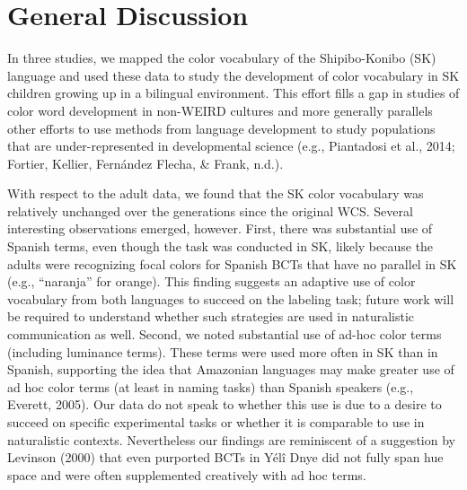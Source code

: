 \documentclass[
  english,
  ,man,floatsintext]{apa6}
\begin{document}
\hypertarget{general-discussion}{%
\section{General Discussion}\label{general-discussion}}

In three studies, we mapped the color vocabulary of the Shipibo-Konibo (SK) language and used these data to study the development of color vocabulary in SK children growing up in a bilingual environment. This effort fills a gap in studies of color word development in non-WEIRD cultures and more generally parallels other efforts to use methods from language development to study populations that are under-represented in developmental science (e.g., Piantadosi et al., 2014; Fortier, Kellier, Fernández Flecha, \& Frank, n.d.).

With respect to the adult data, we found that the SK color vocabulary was relatively unchanged over the generations since the original WCS. Several interesting observations emerged, however. First, there was substantial use of Spanish terms, even though the task was conducted in SK, likely because the adults were recognizing focal colors for Spanish BCTs that have no parallel in SK (e.g., \enquote{naranja} for orange). This finding suggests an adaptive use of color vocabulary from both languages to succeed on the labeling task; future work will be required to understand whether such strategies are used in naturalistic communication as well. Second, we noted substantial use of ad-hoc color terms (including luminance terms). These terms were used more often in SK than in Spanish, supporting the idea that Amazonian languages may make greater use of ad hoc color terms (at least in naming tasks) than Spanish speakers (e.g., Everett, 2005). Our data do not speak to whether this use is due to a desire to succeed on specific experimental tasks or whether it is comparable to use in naturalistic contexts. Nevertheless our findings are reminiscent of a suggestion by Levinson (2000) that even purported BCTs in Yélî Dnye did not fully span hue space and were often supplemented creatively with ad hoc terms.
\end{document}
